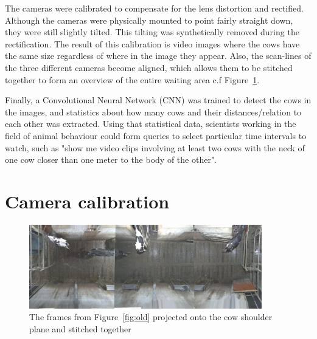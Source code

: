 \documentclass{cta-author}
\begin{document}
The cameras were calibrated to compensate for the lens distortion and rectified. Although the cameras were 
physically mounted to point fairly straight down, they were still slightly tilted. This tilting was 
synthetically removed during the rectification. The result of this calibration is video images where the cows 
have the same size regardless of where in the image they appear. Also, the scan-lines of the three different 
cameras become aligned, which allows them to be stitched together to form an overview of the entire waiting 
area c.f Figure~\ref{fig:stitch}.

Finally, a Convolutional Neural Network (CNN)  was trained to detect the cows in the images, and statistics 
about how many cows and their distances/relation to each other was extracted. Using that statistical data, 
scientists working in the field of animal behaviour could form queries to select particular time intervals to 
watch, such as "show me video clips involving at least two cows with the neck of one cow closer than one 
meter to the body of the other".


\section{Camera calibration}

\begin{figure}[t]
\begin{center}
  \includegraphics[width=0.9\textwidth]{full.jpg}
\end{center}
  \caption{The frames from Figure~\ref{fig:old} projected onto the cow shoulder plane and stitched together}
  \label{fig:stitch}
\end{figure}
\end{document}
